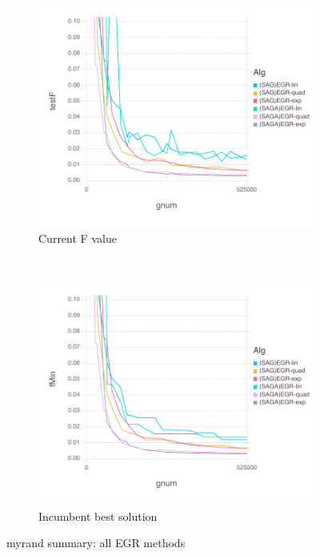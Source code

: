 \documentclass[11pt]{article}
\begin{document}
   

   \begin{figure}[H]
       \centering
       \begin{subfigure}[b]{0.45\textwidth}
           \includegraphics[width=\textwidth]{Figures/myrandBLtrueFfFinal-1.pdf}
           \caption{Current F value}
       \end{subfigure}
       ~ %
         \begin{subfigure}[b]{0.45\textwidth}
             \includegraphics[width=\textwidth]{Figures/myrandBLtrueFminfFinal-2.pdf}
             \caption{Incumbent best solution}
         \end{subfigure}
       \caption{myrand summary: all EGR methods}\label{fig:myrandsummary}
   \end{figure}
\end{document}
